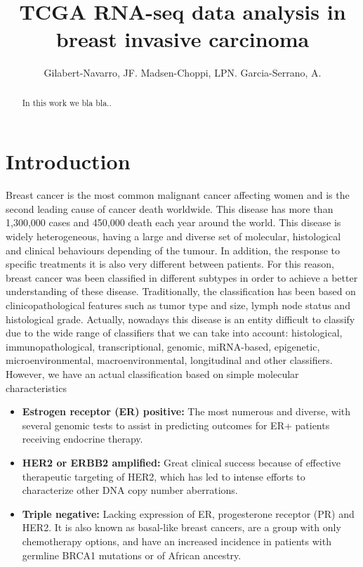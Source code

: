 \documentclass{article}
\begin{document}
\title{TCGA RNA-seq data analysis in breast invasive carcinoma}
\author{Gilabert-Navarro, JF. Madsen-Choppi, LPN. Garcia-Serrano, A.}
\maketitle %

\begin{abstract}
In this work we bla bla..
\end{abstract}

\section*{Introduction}
Breast cancer is the most common malignant cancer affecting women and is the second leading cause of cancer death worldwide\cite{rosam}. This disease has more than 1,300,000 cases and 450,000 death each year around the world\cite{cangen}.
This disease is widely heterogeneous, having a large and diverse set of molecular, histological and clinical behaviours depending of the tumour\cite{rosam}. In addition, the response to specific treatments it is also very different between patients. For this reason, breast cancer was been classified in different subtypes in order to achieve a better understanding of these disease. Traditionally, the classification has been based on clinicopathological features such as tumor type and size, lymph node status and histological grade\cite{rosam}. Actually, nowadays this disease is an entity difficult to classify due to the wide range of classifiers that we can take into account: histological, immunopathological, transcriptional, genomic, miRNA-based, epigenetic, microenvironmental, macroenvironmental, longitudinal and other classifiers\cite{breast}. However, we have an actual classification based on simple molecular characteristics\cite{cangen}
\begin{itemize}
\item \textbf{Estrogen receptor (ER) positive:} The most numerous and diverse, with several genomic tests to assist in predicting outcomes for ER+ patients receiving endocrine therapy.
\item \textbf{ HER2 or ERBB2 amplified:} Great clinical success because of effective therapeutic targeting of HER2, which has led to intense efforts to characterize other DNA copy number aberrations.
\item \textbf{Triple negative:} Lacking expression of ER, progesterone receptor (PR) and HER2. It is also known as basal-like breast cancers, are a group with only chemotherapy options, and have an increased incidence in patients with germline BRCA1 mutations or of African ancestry.
\end{itemize}
\end{document}
